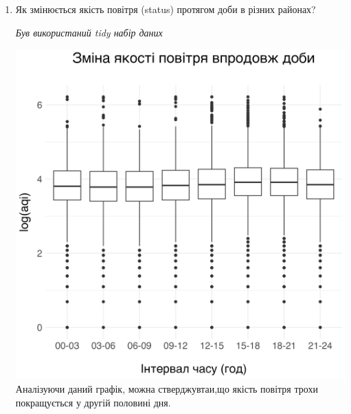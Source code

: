 \documentclass[./report.tex]{subfiles}
\begin{document}
\begin{enumerate}
    \item Як змінюється якість повітря (status) протягом доби в різних районах?
    
    \quad \textit{Був використаний tidy набір даних}

    \includegraphics[width=6in]{plots/question3/box.png}
    Аналізуючи даний графік, можна стверджувтаи,що якість повітря трохи покращується у другій половині дня.
    

\end{enumerate}
\end{document}
